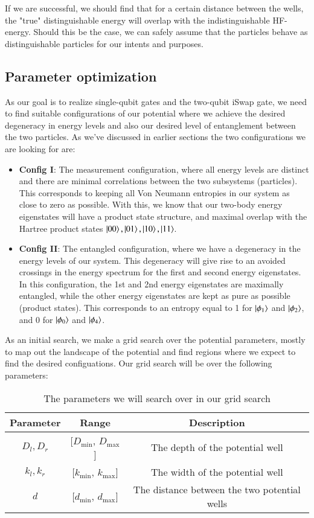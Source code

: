 \documentclass{subfiles}
\begin{document}
If we are successful, we should find that for a certain distance between the wells, the "true" distinguishable energy will overlap with the indistinguishable HF-energy. Should this be the case, we can safely assume that the particles behave as distinguishable particles for our intents and purposes. 


\subsection{Parameter optimization}\label{sec:optimization_procedure}
As our goal is to realize single-qubit gates and the two-qubit iSwap gate, we need to find suitable configurations of our potential where we achieve the desired degeneracy in energy levels and also our desired level of entanglement between the two particles. As we've discussed in earlier sections the two configurations we are looking for are:
\begin{itemize}
    \item \textbf{Config I}: The measurement configuration, where all energy levels are distinct and there are minimal correlations between the two subsystems (particles). This corresponds to keeping all Von Neumann entropies in our system as close to zero as possible. With this, we know that our two-body energy eigenstates will have a product state structure, and maximal overlap with the Hartree product states $\ket{00}, \ket{01}, \ket{10}, \ket{11}$.
    \item \textbf{Config II}: The entangled configuration, where we have a degeneracy in the energy levels of our system. This degeneracy will give rise to an avoided crossings in the energy spectrum for the first and second energy eigenstates. In this configuration, the 1st and 2nd energy eigenstates are maximally entangled, while the other energy eigenstates are kept as pure as possible (product states). This corresponds to an entropy equal to 1 for $\ket{\phi_1}$ and $\ket{\phi_2}$, and 0 for $\ket{\phi_0}$ and $\ket{\phi_4}$. 
\end{itemize}
As an initial search, we make a grid search over the potential parameters, mostly to map out the landscape of the potential and find regions where we expect to find the desired configuations. Our grid search will be over the following parameters:
\begin{table}
    \centering
    \begin{tabular}{|c|c|c|}
        \hline
        Parameter & Range & Description \\
        \hline
        $D_l, D_r$ & [$D_{\text{min}}$, $D_{\text{max}}$] & The depth of the potential well \\
        $k_l, k_r$ & [$k_{\text{min}}$, $k_{\text{max}}$] & The width of the potential well \\
        $d$ & [$d_{\text{min}}$, $d_{\text{max}}$] & The distance between the two potential wells \\
        \hline
    \end{tabular}
    \caption{The parameters we will search over in our grid search}
\end{table}
\end{document}
